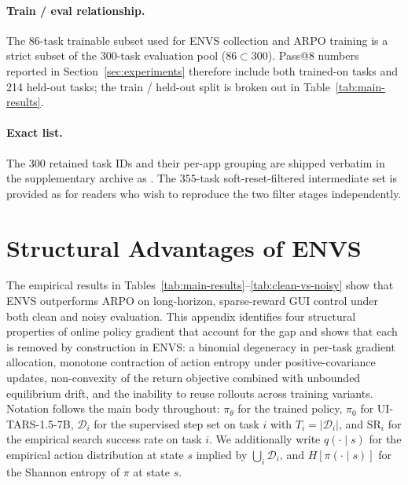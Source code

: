 \documentclass[11pt]{article}
\begin{document}
\paragraph{Train / eval relationship.}
The 86-task trainable subset used for ENVS collection and ARPO training
is a strict subset of the 300-task evaluation pool ($86 \subset 300$).
Pass@8 numbers reported in Section~\ref{sec:experiments} therefore include both trained-on
tasks and 214 held-out tasks; the train / held-out split is broken out
in Table~\ref{tab:main-results}.

\paragraph{Exact list.}
The $300$ retained task IDs and their per-app grouping are shipped
verbatim in the supplementary archive as
.
The $355$-task soft-reset-filtered intermediate set is provided as
 for readers who wish to
reproduce the two filter stages independently.

\section{Structural Advantages of \textsc{ENVS}}
\label{app:envs-vs-rl}

The empirical results in Tables~\ref{tab:main-results}--\ref{tab:clean-vs-noisy}
show that \textsc{ENVS} outperforms ARPO on long-horizon, sparse-reward
GUI control under both clean and noisy evaluation. This appendix
identifies four structural properties of online policy gradient that
account for the gap and shows that each is removed by construction in
\textsc{ENVS}: a binomial degeneracy in per-task gradient allocation,
monotone contraction of action entropy under positive-covariance updates,
non-convexity of the return objective combined with unbounded equilibrium
drift, and the inability to reuse rollouts across training variants.
Notation follows the main body throughout: $\pi_\theta$ for the trained
policy, $\pi_0$ for UI-TARS-1.5-7B, $\mathcal{D}_i$ for the supervised
step set on task $i$ with $T_i = |\mathcal{D}_i|$, and $\mathrm{SR}_i$
for the empirical search success rate on task $i$. We additionally write
$q(\cdot \mid s)$ for the empirical action distribution at state $s$
implied by $\bigcup_i \mathcal{D}_i$, and $H[\pi(\cdot \mid s)]$ for the
Shannon entropy of $\pi$ at state $s$.
\end{document}
